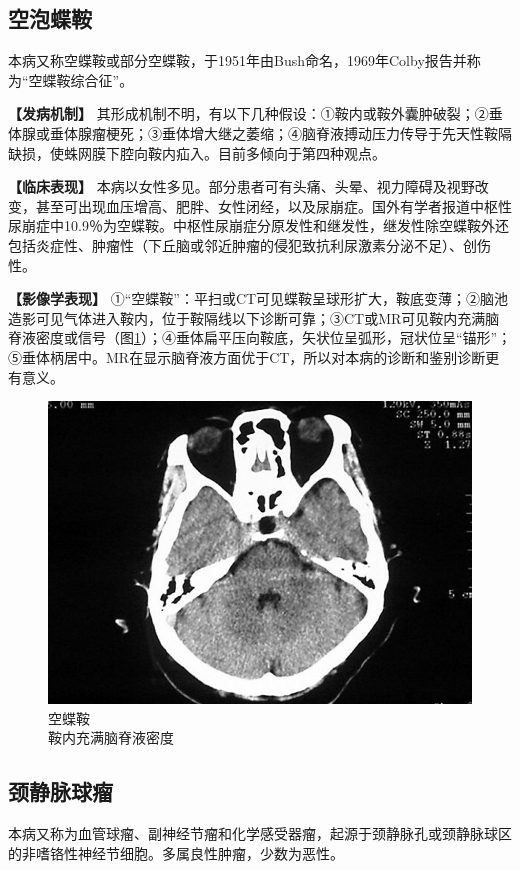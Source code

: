 \subsection{空泡蝶鞍}

本病又称空蝶鞍或部分空蝶鞍，于1951年由Bush命名，1969年Colby报告并称为“空蝶鞍综合征”。

\textbf{【发病机制】}
其形成机制不明，有以下几种假设：①鞍内或鞍外囊肿破裂；②垂体腺或垂体腺瘤梗死；③垂体增大继之萎缩；④脑脊液搏动压力传导于先天性鞍隔缺损，使蛛网膜下腔向鞍内疝入。目前多倾向于第四种观点。

\textbf{【临床表现】}
本病以女性多见。部分患者可有头痛、头晕、视力障碍及视野改变，甚至可出现血压增高、肥胖、女性闭经，以及尿崩症。国外有学者报道中枢性尿崩症中10.9％为空蝶鞍。中枢性尿崩症分原发性和继发性，继发性除空蝶鞍外还包括炎症性、肿瘤性（下丘脑或邻近肿瘤的侵犯致抗利尿激素分泌不足）、创伤性。

\textbf{【影像学表现】}
①“空蝶鞍”：平扫或CT可见蝶鞍呈球形扩大，鞍底变薄；②脑池造影可见气体进入鞍内，位于鞍隔线以下诊断可靠；③CT或MR可见鞍内充满脑脊液密度或信号（图\ref{fig2-52}）；④垂体扁平压向鞍底，矢状位呈弧形，冠状位呈“锚形”；⑤垂体柄居中。MR在显示脑脊液方面优于CT，所以对本病的诊断和鉴别诊断更有意义。

\begin{figure}[!htbp]
 \centering
 \includegraphics[width=.7\textwidth,height=\textheight,keepaspectratio]{./images/Image00084.jpg}
 \captionsetup{justification=centering}
 \caption{空蝶鞍\\{\small 鞍内充满脑脊液密度}}
 \label{fig2-52}
  \end{figure} 

\subsection{颈静脉球瘤}

本病又称为血管球瘤、副神经节瘤和化学感受器瘤，起源于颈静脉孔或颈静脉球区的非嗜铬性神经节细胞。多属良性肿瘤，少数为恶性。


